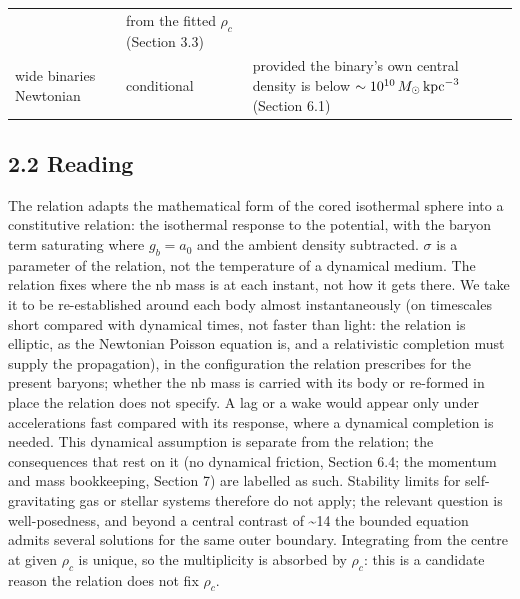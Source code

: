 \documentclass[
  10pt,
]{article}
\begin{document}
\begin{longtable}[]{@{}lll@{}}
\begin{minipage}[t]{0.20\columnwidth}
\end{minipage} & \begin{minipage}[t]{0.50\columnwidth}\raggedright
from the fitted $\rho_c$ (Section 3.3)\strut
\end{minipage}\tabularnewline
\begin{minipage}[t]{0.24\columnwidth}\raggedright
wide binaries Newtonian\strut
\end{minipage} & \begin{minipage}[t]{0.20\columnwidth}\raggedright
conditional\strut
\end{minipage} & \begin{minipage}[t]{0.50\columnwidth}\raggedright
provided the binary's own central density is below $\sim10^{10}\,M_\odot\,{\rm kpc}^{-3}$ (Section 6.1)\strut
\end{minipage}\tabularnewline
\bottomrule
\end{longtable}

\subsection{2.2 Reading}\label{reading}

The relation adapts the mathematical form of the cored isothermal sphere into
a constitutive relation: the isothermal response to the potential, with
the baryon term saturating where $g_b=a_0$ and the ambient density
subtracted. $\sigma$ is a parameter of the relation, not the temperature of a
dynamical medium. The relation fixes where the nb mass is at each instant,
not how it gets there. We take it to be re-established around each body
almost instantaneously (on timescales short compared with dynamical times, not faster than light: the relation is elliptic, as the Newtonian Poisson equation is, and a relativistic completion must supply the propagation), in the configuration the relation prescribes for the
present baryons; whether the nb mass is carried with its body or re-formed
in place the relation does not specify. A lag or a wake would appear only under
accelerations fast compared with its response, where a dynamical
completion is needed. This dynamical assumption is separate from the relation;
the consequences that rest on it (no dynamical friction, Section 6.4; the
momentum and mass bookkeeping, Section 7) are labelled as such. Stability limits for self-gravitating gas or
stellar systems therefore do not apply; the relevant question is
well-posedness, and beyond a central contrast of \textasciitilde{}14 the
bounded equation admits several solutions for the same outer boundary.
Integrating from the centre at given $\rho_c$ is unique, so the
multiplicity is absorbed by $\rho_c$: this is a candidate reason the relation
does not fix $\rho_c$.
\end{document}
